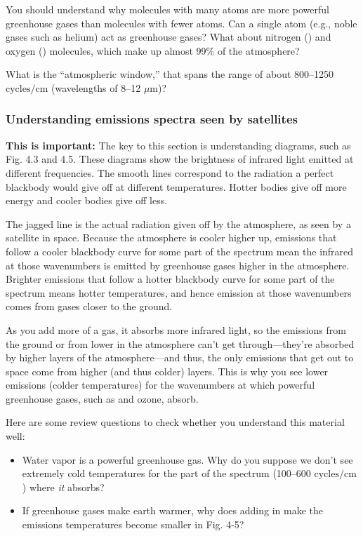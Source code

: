 \documentclass[
]{article}
\providecommand{\tightlist}{%
  \setlength{\itemsep}{0pt}\setlength{\parskip}{0pt}}
\newcommand{\Ntwo}{\ce{N2}}
\newcommand{\Otwo}{\ce{O2}}
\newcommand{\COO}{\ce{CO2}}
\begin{document}
You should understand why molecules with many atoms are more powerful
greenhouse gases than molecules with fewer atoms. Can a single atom
(e.g., noble gases such as helium) act as greenhouse gases? What about
nitrogen (\Ntwo) and oxygen (\Otwo) molecules, which make up almost 99\%
of the atmosphere?

What is the ``atmospheric window,'' that spans the range of about
800--1250 \(\text{cycles}/\text{cm}\) (wavelengths of 8--12 \(\mu\)m)?

\hypertarget{understanding-emissions-spectra-seen-by-satellites}{%
\subsubsection{Understanding emissions spectra seen by
satellites}\label{understanding-emissions-spectra-seen-by-satellites}}

\textbf{This is important:} The key to this section is understanding
diagrams, such as Fig. 4.3 and 4.5. These diagrams show the brightness
of infrared light emitted at different frequencies. The smooth lines
correspond to the radiation a perfect blackbody would give off at
different temperatures. Hotter bodies give off more energy and cooler
bodies give off less.

The jagged line is the actual radiation given off by the atmosphere, as
seen by a satellite in space. Because the atmosphere is cooler higher
up, emissions that follow a cooler blackbody curve for some part of the
spectrum mean the infrared at those wavenumbers is emitted by greenhouse
gases higher in the atmosphere. Brighter emissions that follow a hotter
blackbody curve for some part of the spectrum means hotter temperatures,
and hence emission at those wavenumbers comes from gases closer to the
ground.

As you add more of a gas, it absorbs more infrared light, so the
emissions from the ground or from lower in the atmosphere can't get
through---they're absorbed by higher layers of the atmosphere---and
thus, the only emissions that get out to space come from higher (and
thus colder) layers. This is why you see lower emissions (colder
temperatures) for the wavenumbers at which powerful greenhouse gases,
such as \COO and ozone, absorb.

Here are some review questions to check whether you understand this
material well:

\begin{itemize}
\tightlist
\item
  Water vapor is a powerful greenhouse gas. Why do you suppose we don't
  see extremely cold temperatures for the part of the spectrum (100--600
  \(\text{cycles}/\text{cm}\)) where \emph{it} absorbs?
\item
  If greenhouse gases make earth warmer, why does adding \COO in make
  the emissions temperatures become smaller in Fig. 4-5?
\end{itemize}
\end{document}

